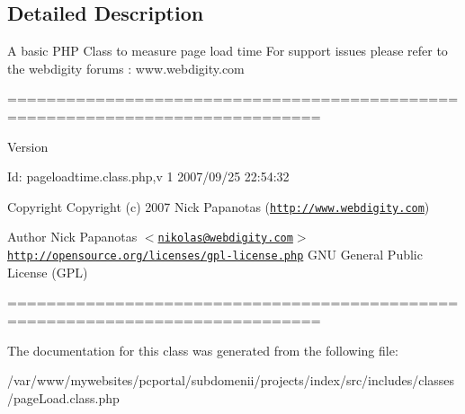 \subsection{Detailed Description}
A basic PHP Class to measure page load time For support issues please refer to the webdigity forums : www.webdigity.com

==============================================================================

\begin{DoxyVersion}{Version}

\end{DoxyVersion}
\begin{DoxyParagraph}{Id:}
\-p\-a\-g\-e\-l\-o\-a\-d\-t\-i\-m\-e\-.\-c\-l\-a\-s\-s\-.\-p\-h\-p,v 1 2007/09/25 22:54:32 
\end{DoxyParagraph}
\begin{DoxyCopyright}{Copyright}
Copyright (c) 2007 Nick Papanotas (\href{http://www.webdigity.com}{\tt http://www.webdigity.com}) 
\end{DoxyCopyright}
\begin{DoxyAuthor}{Author}
Nick Papanotas $<$\href{mailto:nikolas@webdigity.com}{\tt nikolas@webdigity.com}$>$  \href{http://opensource.org/licenses/gpl-license.php}{\tt http://opensource.org/licenses/gpl-\/license.php} GNU General Public License (GPL)
\end{DoxyAuthor}
============================================================================== 

The documentation for this class was generated from the following file:\begin{DoxyCompactItemize}
\item 
\-/\-v\-a\-r\-/\-w\-w\-w\-/\-m\-y\-w\-e\-b\-s\-i\-t\-e\-s\-/\-p\-c\-p\-o\-r\-t\-a\-l\-/\-s\-u\-b\-d\-o\-m\-e\-n\-i\-i\-/\-p\-r\-o\-j\-e\-c\-t\-s\-/\-i\-n\-d\-e\-x\-/\-s\-r\-c\-/\-i\-n\-c\-l\-u\-d\-e\-s\-/\-c\-l\-a\-s\-s\-e\-s\-/\-p\-a\-g\-e\-L\-o\-a\-d\-.\-c\-l\-a\-s\-s\-.\-p\-h\-p\end{DoxyCompactItemize}
